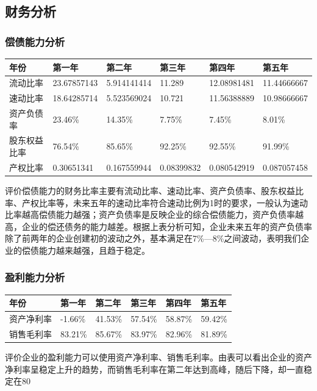 \documentclass[UTF8]{ctexart}
\begin{document}
\subsection{财务分析}
\subsubsection{偿债能力分析}
\begin{table}[H]
	\centering
	\begin{tabular}{|l|l|l|l|l|l|}
		\hline
		年份         & 第一年      & 第二年      & 第三年     & 第四年      & 第五年      \\ \hline
		流动比率     & 23.67857143 & 5.914141414 & 11.289     & 12.08981481 & 11.44666667 \\ \hline
		速动比率     & 18.64285714 & 5.523569024 & 10.721     & 11.56388889 & 10.98666667 \\ \hline
		资产负债率   & 23.46\%     & 14.35\%     & 7.75\%     & 7.45\%      & 8.01\%      \\ \hline
		股东权益比率 & 76.54\%     & 85.65\%     & 92.25\%    & 92.55\%     & 91.99\%     \\ \hline
		产权比率     & 0.30651341  & 0.167559944 & 0.08399832 & 0.080542919 & 0.087057458 \\ \hline
	\end{tabular}
\end{table}
评价偿债能力的财务比率主要有流动比率、速动比率、资产负债率、股东权益比率、产权比率等，未来五年的速动比率符合速动比例为1时的要求，一般认为速动比率越高偿债能力越强；资产负债率是反映企业的综合偿债能力，资产负债率越高，企业的偿还债务的能力越差。根据上表分析可知，企业未来五年的资产负债率除了前两年的企业创建初的波动之外，基本满足在7\%—8\%之间波动，表明我们企业的偿债能力越来越强，且趋于稳定。
\subsubsection{盈利能力分析}
\begin{table}[H]
	\centering
	\begin{tabular}{|l|l|l|l|l|l|}
		\hline
		年份       & 第一年  & 第二年  & 第三年  & 第四年  & 第五年  \\ \hline
		资产净利率 & -1.66\% & 41.53\% & 57.54\% & 58.87\% & 59.42\% \\ \hline
		销售毛利率 & 83.21\% & 85.67\% & 83.97\% & 82.96\% & 81.89\% \\ \hline
	\end{tabular}
\end{table}
评价企业的盈利能力可以使用资产净利率、销售毛利率。由表可以看出企业的资产净利率呈稳定上升的趋势，而销售毛利率在第二年达到高峰，随后下降，却一直稳定在80%
\end{document}
